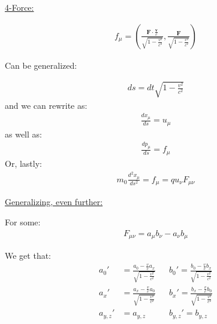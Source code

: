 \documentclass{article}
\newcommand{\sheader}[1]{\underline{#1:}}
\begin{document}
\sheader{4-Force}

\begin{align*}
    f_\mu = \left(\frac{\mathbf{F} \cdot \frac{\mathbf{v}}{c}}{\sqrt{1 - \frac{v^2}{c^2}}}, \frac{\mathbf{F}}{\sqrt{1 - \frac{v^2}{c^2}}}\right)
\end{align*}

Can be generalized:

\begin{align*}
    ds = dt \sqrt{1 - \frac{v^2}{c^2}}
\end{align*}
and we can rewrite as:
\begin{align*}
    \frac{dx_\mu}{ds} = u_\mu
\end{align*}
as well as:
\begin{align*}
    \frac{dp_\mu}{ds}= f_\mu
\end{align*}
Or, lastly:
\begin{align*}
    m_0 \frac{d^2x_\mu}{ds^2} = f_\mu = qu_\nu F_{\mu \nu}
\end{align*}

\sheader{Generalizing, even further}

For some:
\begin{align*}
    F_{\mu\nu} = a_\mu b_\nu - a_\nu b_\mu
\end{align*}

We get that:
\begin{align*}
    a_0' &= \frac{a_0 - \frac{v}{c} a_x}{\sqrt{1 - \frac{v^2}{c^2}}} && b_0' = \frac{b_0 - \frac{v}{c} b_x}{\sqrt{1 - \frac{v^2}{c^2}}}\\
    a_x' &= \frac{a_x - \frac{v}{c} a_0}{\sqrt{1 - \frac{v^2}{c^2}}} && b_x' = \frac{b_x - \frac{v}{c} b_0}{\sqrt{1 - \frac{v^2}{c^2}}}\\
    a_{y, z}' &= a_{y, z}  && b_{y, z}' = b_{y, z}
\end{align*}
\end{document}

